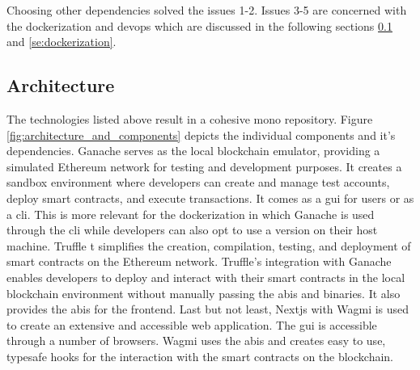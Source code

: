 \documentclass[oneside,a4paper,12pt, colorinlistoftodos]{article} %
\begin{document}
Choosing other dependencies solved the issues 1-2. Issues 3-5 are concerned with the dockerization and devops which are discussed in the following sections \ref{se:architecture} and \ref{se:dockerization}.
\subsection{Architecture}\label{se:architecture}

The technologies listed above result in a cohesive mono repository. Figure \ref{fig:architecture_and_components} depicts the individual components and it's dependencies. Ganache serves as the local blockchain emulator, providing a simulated Ethereum network for testing and development purposes. It creates a sandbox environment where developers can create and manage test accounts, deploy smart contracts, and execute transactions. It comes as a \gls{gui} for users or as a \gls{cli}. This is more relevant for the dockerization in which Ganache is used through the \gls{cli} while developers can also opt to use a version on their host machine.
Truffle t simplifies the creation, compilation, testing, and deployment of smart contracts on the Ethereum network. Truffle's integration with Ganache enables developers to deploy and interact with their smart contracts in the local blockchain environment without manually passing the \glspl{abi} and binaries. It also provides the \glspl{abi} for the frontend.
Last but not least, Nextjs with Wagmi is used to create an extensive and accessible web application. The \gls{gui} is accessible through a number of browsers. Wagmi uses the \glspl{abi} and creates easy to use, typesafe hooks for the interaction with the smart contracts on the blockchain.
\end{document}
